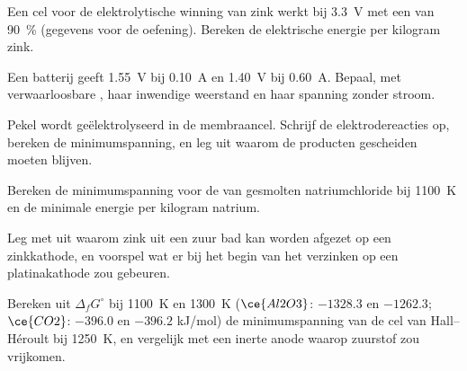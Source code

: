 \begin{exercise}[$\star\star$]\label{exo:b2:batteries-electrolysis:6}
Een cel voor de elektrolytische winning van zink werkt bij \qty{3.3}{V} met een  van
90~\% (gegevens voor de oefening). Bereken de elektrische energie per kilogram zink.
\end{exercise}

\begin{exercise}[$\star\star$]\label{exo:b2:batteries-electrolysis:7}
Een batterij geeft \qty{1.55}{V} bij \qty{0.10}{A} en \qty{1.40}{V} bij \qty{0.60}{A}.
Bepaal, met verwaarloosbare , haar inwendige weerstand en haar
spanning zonder stroom.
\end{exercise}

\begin{exercise}[$\star\star$]\label{exo:b2:batteries-electrolysis:8}
Pekel wordt geëlektrolyseerd in de membraancel. Schrijf de elektrodereacties op,
bereken de minimumspanning, en leg uit waarom de producten gescheiden moeten
blijven.
\end{exercise}

\begin{exercise}[$\star\star$]\label{exo:b2:batteries-electrolysis:9}
Bereken de minimumspanning voor de  van gesmolten natriumchloride bij
\qty{1100}{K} en de minimale energie per kilogram natrium.
\end{exercise}

\begin{exercise}[$\star\star\star$]\label{exo:b2:batteries-electrolysis:10}
Leg met  uit waarom zink uit een zuur bad kan worden
afgezet op een zinkkathode, en voorspel wat er bij het begin van het verzinken
op een platinakathode zou gebeuren.
\end{exercise}

\begin{exercise}[$\star\star\star$]\label{exo:b2:batteries-electrolysis:11}
Bereken uit $\Delta_f G^\circ$ bij \qty{1100}{K} en \qty{1300}{K} ($\ce{Al2O3}$: $-1328.3$ en
$-1262.3$; $\ce{CO2}$: $-396.0$ en $-396.2$ \unit{kJ/mol}) de minimumspanning
van de cel van Hall--Héroult bij \qty{1250}{K}, en vergelijk met een
inerte anode waarop zuurstof zou vrijkomen.
\end{exercise}

